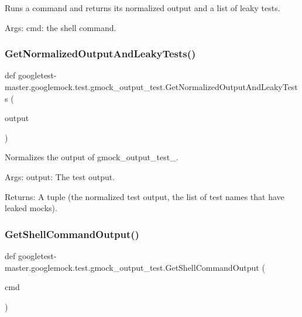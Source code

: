 \begin{DoxyVerb}Runs a command and returns its normalized output and a list of leaky tests.

Args:
  cmd:  the shell command.
\end{DoxyVerb}
 \mbox{\label{namespacegoogletest-master_1_1googlemock_1_1test_1_1gmock__output__test_a12292601e8aeeb9110380b806c463002}} 
\subsubsection{\texorpdfstring{GetNormalizedOutputAndLeakyTests()}{GetNormalizedOutputAndLeakyTests()}}
{\footnotesize\ttfamily def googletest-\/master.\+googlemock.\+test.\+gmock\+\_\+output\+\_\+test.\+Get\+Normalized\+Output\+And\+Leaky\+Tests (\begin{DoxyParamCaption}\item[{}]{output }\end{DoxyParamCaption})}

\begin{DoxyVerb}Normalizes the output of gmock_output_test_.

Args:
  output: The test output.

Returns:
  A tuple (the normalized test output, the list of test names that have
  leaked mocks).
\end{DoxyVerb}
 \mbox{\label{namespacegoogletest-master_1_1googlemock_1_1test_1_1gmock__output__test_a2665f5cbda1f02e5ed515a5bcfc7babc}} 
\subsubsection{\texorpdfstring{GetShellCommandOutput()}{GetShellCommandOutput()}}
{\footnotesize\ttfamily def googletest-\/master.\+googlemock.\+test.\+gmock\+\_\+output\+\_\+test.\+Get\+Shell\+Command\+Output (\begin{DoxyParamCaption}\item[{}]{cmd }\end{DoxyParamCaption})}

